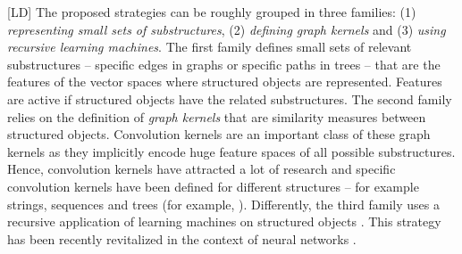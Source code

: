 \documentclass[twoside,11pt]{article}
\def\LD#1{[{\color{blue}L}D] {\color{blue}#1}}
\begin{document}
\LD{The proposed strategies can be roughly grouped in three families: (1) \emph{representing small sets of substructures}, (2) \emph{defining graph kernels} and (3) \emph{using recursive learning machines}.}
The first family defines small sets of relevant substructures --
specific edges in graphs \cite{Even-Zohar:2000:CAW:974305.974322} or specific paths in trees \cite{GildeaJurafsky:2002:CL} --
that are the features of the vector spaces where structured objects are represented. Features are active if structured objects have the related substructures. 
The second family relies on the definition of \emph{graph kernels} \cite{} that are similarity measures between structured objects.
Convolution kernels \cite{Haussler99convolutionkernels} are an important class of these graph kernels as 
they implicitly encode huge feature spaces of all possible substructures.  Hence, convolution kernels have attracted a lot of research and specific convolution kernels have been defined for different structures --  for example strings, sequences \cite{Lodhi:2002:TCU:944790.944799} and trees 
(for example, \cite{DBLP:conf/nips/CollinsD01,Aiolli2009,Kimura:2011:SKR:2017863.2017871}). 
Differently, the third family uses a recursive application of learning machines on structured objects \cite{}. This strategy has been recently revitalized in the context of neural networks \cite{}. 
\end{document}
